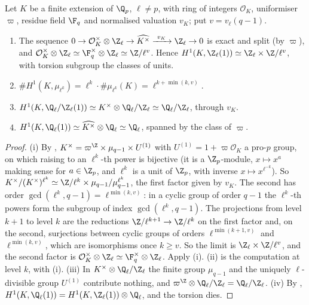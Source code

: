 \begin{proposition}\label{prop:galcoh:kummer-local}
Let $K$ be a finite extension of $\Q_p$, $\ell\ne p$, with ring of integers $\mathcal O_K$, uniformiser $\varpi$, residue field $\F_q$ and normalised valuation $v_K$; put
$v=v_\ell(q-1)$.
\begin{enumerate}[label=(\roman*)]
\item The sequence $0\to\mathcal O_K^\times\otimes\Z_\ell\to\widehat{K^\times}\xrightarrow{\ v_K\ }\Z_\ell\to0$ is exact and split (by $\varpi$), and
$\mathcal O_K^\times\otimes\Z_\ell\simeq\F_q^\times\otimes\Z_\ell\simeq\Z/\ell^v$. Hence $H^1(K,\Z_\ell(1))\simeq\Z_\ell\times\Z/\ell^v$, with torsion subgroup the classes of units.
\item $\#H^1(K,\mu_{\ell^k})=\ell^k\cdot\#\mu_{\ell^k}(K)=\ell^{k+\min(k,v)}$.
\item $H^1(K,\Q_\ell/\Z_\ell(1))\simeq K^\times\otimes\Q_\ell/\Z_\ell\simeq\Q_\ell/\Z_\ell$, through $v_K$.
\item $H^1(K,\Q_\ell(1))\simeq\widehat{K^\times}\otimes\Q_\ell\simeq\Q_\ell$, spanned by the class of $\varpi$.
\end{enumerate}
\end{proposition}

\begin{proof}
(i) By , $K^\times=\varpi^{\Z}\times\mu_{q-1}\times U^{(1)}$ with $U^{(1)}=1+\varpi\mathcal O_K$ a pro-$p$ group, on which raising to an $\ell^k$-th power is
bijective (it is a $\Z_p$-module, $x\mapsto x^a$ making sense for $a\in\Z_p$, and $\ell^k$ is a unit of $\Z_p$, with inverse $x\mapsto x^{\ell^{-k}}$). So
$K^\times/(K^\times)^{\ell^k}\simeq\Z/\ell^k\times\mu_{q-1}/\mu_{q-1}^{\ell^k}$, the first factor given by $v_K$. The second has order $\gcd(\ell^k,q-1)=\ell^{\min(k,v)}$: in a cyclic
group of order $q-1$ the $\ell^k$-th powers form the subgroup of index $\gcd(\ell^k,q-1)$. The projections from level $k+1$ to level $k$ are the reductions
$\Z/\ell^{k+1}\to\Z/\ell^k$ on the first factor and, on the second, surjections between cyclic groups of orders $\ell^{\min(k+1,v)}$ and $\ell^{\min(k,v)}$, which are isomorphisms once
$k\ge v$. So the limit is $\Z_\ell\times\Z/\ell^v$, and the second factor is $\mathcal O_K^\times\otimes\Z_\ell\simeq\F_q^\times\otimes\Z_\ell$. Apply (i).
(ii) is the computation at level $k$, with (i). (iii) In $K^\times\otimes\Q_\ell/\Z_\ell$ the finite group $\mu_{q-1}$ and the uniquely $\ell$-divisible
group $U^{(1)}$ contribute nothing, and $\varpi^{\Z}\otimes\Q_\ell/\Z_\ell=\Q_\ell/\Z_\ell$. (iv) By , $H^1(K,\Q_\ell(1))=H^1(K,\Z_\ell(1))\otimes\Q_\ell$, and the
torsion dies.
\end{proof}


